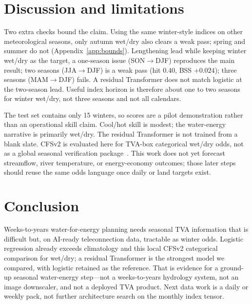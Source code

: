 \documentclass{article}
\begin{document}
\section{Discussion and limitations}

Two extra checks bound the claim. Using the same winter-style indices on other meteorological seasons, only autumn wet/dry also clears a weak pass; spring and summer do not (Appendix~\ref{app:bounds}). Lengthening lead while keeping winter wet/dry as the target, a one-season issue (SON$\rightarrow$DJF) reproduces the main result; two seasons (JJA$\rightarrow$DJF) is a weak pass (hit \(0.40\), BSS \(+0.024\)); three seasons (MAM$\rightarrow$DJF) fails. A residual Transformer does not match logistic at the two-season lead. Useful index horizon is therefore about one to two seasons for winter wet/dry, not three seasons and not all calendars.

The test set contains only 15 winters, so scores are a pilot demonstration rather than an operational skill claim. Cool/hot skill is modest; the water-energy narrative is primarily wet/dry. The residual Transformer is not trained from a blank slate. CFSv2 is evaluated here for TVA-box categorical wet/dry odds, not as a global seasonal verification package~\citep{barnston2012cfsv2}. This work does not yet forecast streamflow, river temperature, or energy-economy outcomes; those later steps should reuse the same odds language once daily or land targets exist.

\section{Conclusion}

Weeks-to-years water-for-energy planning needs seasonal TVA information that is difficult but, on AI-ready teleconnection data, tractable as winter odds. Logistic regression already exceeds climatology and this local CFSv2 categorical comparison for wet/dry; a residual Transformer is the strongest model we compared, with logistic retained as the reference. That is evidence for a ground-up seasonal water-energy step---not a weeks-to-years hydrology system, not an image downscaler, and not a deployed TVA product. Next data work is a daily or weekly pack, not further architecture search on the monthly index tensor.
\end{document}
